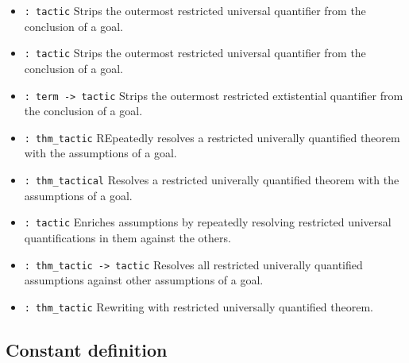 \begin{itemize}
\item {} \verb|: tactic|\newline
Strips the outermost restricted universal quantifier from
the conclusion of a goal.

\item {} \verb|: tactic|\newline
Strips the outermost restricted universal quantifier from
the conclusion of a goal.

\item {} \verb|: term -> tactic|\newline
Strips the outermost restricted extistential quantifier from
the conclusion of a goal.

\item {} \verb|: thm_tactic|\newline
REpeatedly resolves a restricted univerally quantified theorem with
the assumptions of a goal.

\item {} \verb|: thm_tactical|\newline
Resolves a restricted univerally quantified theorem with
the assumptions of a goal.

\item {} \verb|: tactic|\newline
Enriches assumptions by repeatedly resolving restricted universal
quantifications in them against the others.

\item {} \verb|: thm_tactic -> tactic|\newline
Resolves all restricted univerally quantified assumptions against
other assumptions of a goal.

\item {} \verb|: thm_tactic|\newline
Rewriting with restricted universally quantified theorem.
\end{itemize}

\subsection*{Constant definition}

